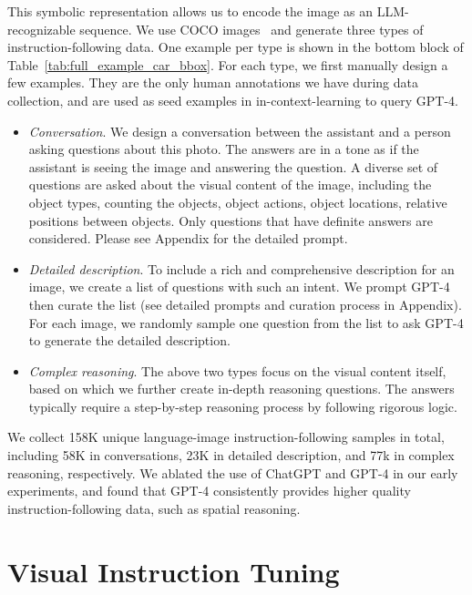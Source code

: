 This symbolic representation allows us to encode the image as an LLM-recognizable sequence. We use COCO images~\cite{lin2014microsoft} and generate three types of instruction-following data. 
One example per type is shown in the bottom block of Table~\ref{tab:full_example_car_bbox}.
For each type, we first manually design a few examples. They are the only human annotations we have during data collection, and are used as seed examples in in-context-learning to query GPT-4.

\begin{itemize}[leftmargin=7.5mm]
\setlength{\itemsep}{2pt}
\item 
{\it Conversation}. We design a conversation between the assistant and a person asking questions about this photo. The answers are in a tone as if the assistant is seeing the image and answering the question. A diverse set of questions are asked about the visual content of the image, including the object types, counting
the objects, object actions, object locations, relative positions between objects. Only questions that have definite answers are considered. Please see Appendix for the detailed prompt.

\item
{\it Detailed description}. To include a rich and comprehensive description for an image, we create a list of questions with such an intent. We prompt GPT-4 then curate the list (see detailed prompts and curation process in Appendix). For each image, we randomly sample one question from the list to ask GPT-4 to generate the detailed description. 

\item
{\it Complex reasoning}. The above two types focus on the visual content itself, based on which we further create in-depth reasoning questions. The answers typically require a step-by-step reasoning process by following rigorous logic. 
\end{itemize}

We collect 158K unique language-image instruction-following samples in total, including 58K in conversations, 23K in detailed description, and 77k in complex reasoning, respectively. We ablated the use of ChatGPT and GPT-4 in our early experiments, and found that GPT-4 consistently provides higher quality instruction-following data, such as spatial reasoning. 




\section{Visual Instruction Tuning}

